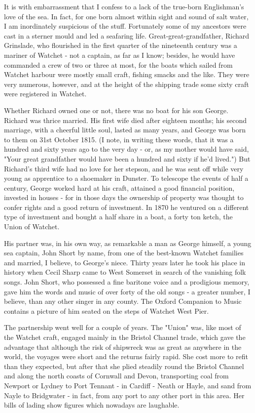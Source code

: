 It is with embarrassment that I confess to a lack of the true-born Englishman's love of the sea. In fact, for one born almost within sight and sound of salt water, I am inordinately suspicious of the stuff. Fortunately some of my ancestors were cast in a sterner mould and led a seafaring life. Great-great-grandfather, Richard Grinslade, who flourished in the first quarter of the nineteenth century was a mariner of Watchet - not a captain, as far as I know; besides, he would have commanded a crew of two or three at most, for the boats which sailed from Watchet harbour were mostly small craft, fishing smacks and the like. They were very numerous, however, and at the height of the shipping trade some sixty craft were registered in Watchet.

Whether Richard owned one or not, there was no boat for his son George. Richard was thrice married. His first wife died after eighteen months; his second marriage, with a cheerful little soul, lasted as many years, and George was born to them on 31st October 1815. (I note, in writing these words, that it was a hundred and sixty years ago to the very day - or, as my mother would have said, "Your great grandfather would have been a hundred and sixty if he'd lived.") But Richard's third wife had no love for her stepson, and he was sent off while very young as apprentice to a shoemaker in Dunster.
To telescope the events of half a century, George worked hard at his craft, attained a good financial position, invested in houses - for in those days the ownership of property was thought to confer rights and a good return of investment. In 1870 he ventured on a different type of investment and bought a half share in a boat, a forty ton ketch, the Union of Watchet.

His partner was, in his own way, as remarkable a man as George himself, a young sea captain, John Short by name, from one of the best-known Watchet families and married, I believe, to George's niece. Thirty years later he took his place in history when Cecil Sharp came to West Somerset in search of the vanishing folk songs. John Short, who possessed a fine baritone voice and a prodigious memory, gave him the words and music of over forty of the old songs - a greater number, I believe, than any other singer in any county. The Oxford Companion to Music contains a picture of him seated on the steps of Watchet West Pier.

The partnership went well for a couple of years. The "Union" was, like most of the Watchet craft, engaged mainly in the Bristol Channel trade, which gave the advantage that although the risk of shipwreck was as great as anywhere in the world, the voyages were short and the returns fairly rapid. She cost more to refit than they expected, but after that she plied steadily round the Bristol Channel and along the north coasts of Cornwall and Devon, transporting coal from Newport or Lydney to Port Tennant - in Cardiff - Neath or Hayle, and sand from Nayle to Bridgwater - in fact, from any port to any other port in this area. Her bills of lading show figures which nowadays are laughable.

